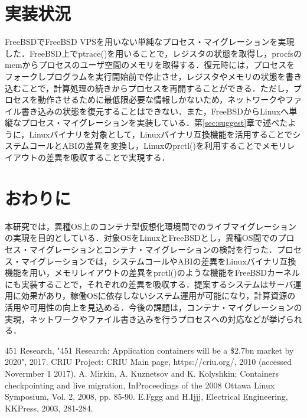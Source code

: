 \documentclass[11pt]{jarticle}
\begin{document}
\section{実装状況}
FreeBSDでFreeBSD VPSを用いない単純なプロセス・マイグレーションを実現した．FreeBSD上でptrace()を用いることで，レジスタの状態を取得し，procfsのmemからプロセスのユーザ空間のメモリを取得する．復元時には，プロセスをフォークしプログラムを実行開始前で停止させ，レジスタやメモリの状態を書き込むことで，計算処理の続きからプロセスを再開することができる．ただし，プロセスを動作させるために最低限必要な情報しかないため，ネットワークやファイル書き込みの状態を復元することはできない．また，FreeBSDからLinuxへ単縦なプロセス・マイグレーションを実装している．第\ref{sec:suggest}章で述べたように，Linuxバイナリを対象として，Linuxバイナリ互換機能を活用することでシステムコールとABIの差異を変換し，Linuxのprctl()を利用することでメモリレイアウトの差異を吸収することで実現する．

\section{おわりに}
本研究では，異種OS上のコンテナ型仮想化環境間でのライブマイグレーションの実現を目的としている．対象OSをLinuxとFreeBSDとし，異種OS間でのプロセス・マイグレーションとコンテナ・マイグレーションの検討を行った．プロセス・マイグレーションでは，システムコールやABIの差異をLinuxバイナリ互換機能を用い，メモリレイアウトの差異をprctl()のような機能をFreeBSDカーネルにも実装することで，それぞれの差異を吸収する．提案するシステムはサーバ運用に効果があり，稼働OSに依存しないシステム運用が可能になり，計算資源の活用や可用性の向上を見込める．今後の課題は，コンテナ・マイグレーションの実現，ネットワークやファイル書き込みを行うプロセスへの対応などが挙げられる．



\begin{thebibliography}{99}
	451 Research, "451 Research: Application containers will be a \$2.7bn market by 2020", 2017.
	CRIU Project: CRIU Main page, https://criu.org/, 2010 (accessed Novermber 1 2017).
	A. Mirkin, A. Kuznetsov and K. Kolyshkin; Containers checkpointing and live migration, InProceedings of the 2008 Ottawa Linux Symposium, Vol. 2, 2008, pp. 85-90.
	E.Fggg and H.Ijjj, Electrical Engineering, KKPress, 2003, 281-284.
\end{thebibliography}
\end{document}
